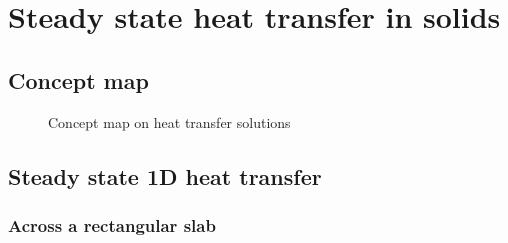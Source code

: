 \chapter{Steady state heat transfer in solids}
\label{ch:heatcases1}

\section{Concept map}


\begin{figure}[h]
\begin{center}
\end{center}
\caption{Concept map on heat transfer solutions}
\label{conceptmapheatsolutions}
\end{figure}


\section{Steady state 1D heat transfer}

\subsection{Across a rectangular slab}

